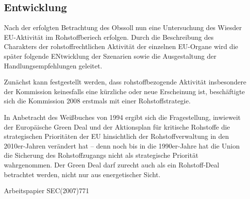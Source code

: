 \documentclass[12pt,a4paper,oneside]{book} %
\begin{document}
		
\subsection{Entwicklung}

Nach der erfolgten Betrachtung des \glqq Obs\grqq soll nun eine Untersuchung des \glqq Wies\grqq der EU-Aktivität im Rohstoffberiech erfolgen. Durch die Beschreibung des Charakters der rohstoffrechtlichen Aktivität der einzelnen EU-Organe wird die später folgende ENtwicklung der Szenarien sowie die Ausgestaltung der Handlungsempfehlungen geleitet.

Zunächst kann festgestellt werden, dass rohstoffbezogende Aktivität insbesondere der Kommission keinesfalls eine kürzliche oder neue Erscheinung ist, beschäftigte sich die Kommission 2008 erstmals mit einer Rohstoffstrategie.

In Anbetracht des Weißbuches von 1994 ergibt sich die Fragestellung, inwieweit der Europäische Green Deal und der Aktionsplan für kritische Rohstoffe die strategischen Prioritäten der EU hinsichtlich der Rohstoffverwaltung in den 2010er-Jahren verändert hat -- denn noch bis in die 1990er-Jahre hat die Union die Sicherung des Rohstoffzugangs nicht als strategische Priorität wahrgenommen\autocite[7]{Kueblboeck_2023}. Der Green Deal darf zurecht auch als ein Rohstoff-Deal betrachtet werden, nicht nur aus energetischer Sicht.\autocite{ZRP 2023, 207}
	
Arbeitspapier SEC(2007)771
	
\end{document}
